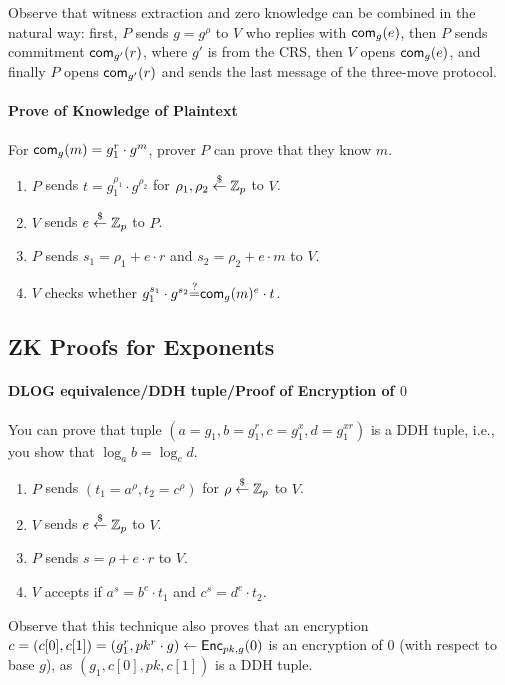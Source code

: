 \documentclass{article}
\begin{document}
Observe that witness extraction and zero knowledge can be combined in
the natural way: first, $P$ sends $g=g^\rho$ to $V$ who replies with
$\mathsf{com}_g(e)$, then $P$ sends commitment $\mathsf{com}_{g'}(r)$, where $g'$ is
from the CRS, then $V$ opens $\mathsf{com}_g(e)$, and finally $P$ opens
$\mathsf{com}_{g'}(r)$ and sends the last message of the three-move protocol.

\paragraph{Prove of Knowledge of Plaintext}
For $\mathsf{com}_{g}(m)=g_1^r\cdot{}g^m$,  prover $P$ can prove that they know
$m$.

\begin{enumerate}
\item $P$ sends $t=g_1^{\rho_1}\cdot{}g^{\rho_2}$ for
  $\rho_1,\rho_2\stackrel{\$}{\leftarrow}\mathbb{Z}_p$ to $V$.
\item $V$ sends $e\stackrel{\$}{\leftarrow}\mathbb{Z}_p$ to $P$.
  \item $P$ sends $s_1=\rho_1+e\cdot{}r$ and $s_2=\rho_2+e\cdot{}m$ to
    $V$.
    \item $V$ checks whether $g_1^{s_1}\cdot{}g^{s_2}{\stackrel{?}{=}}\mathsf{com}_{g}(m)^e\cdot{}t$.
\end{enumerate}


\subsection{ZK Proofs for Exponents}
\paragraph{DLOG equivalence/DDH tuple/Proof of Encryption of $0$}
You can prove that tuple $(a=g_1,b=g_1^r,c=g_1^x,d=g_1^{xr})$ is a DDH
tuple, i.e., you show that $\log_{a}{b}=\log_c{d}$.

\begin{enumerate}
\item $P$ sends $(t_1=a^{\rho},t_2=c^{\rho})$ for $\rho\stackrel{\$}{\leftarrow}\mathbb{Z}_p$ to $V$.
  \item $V$ sends $e\stackrel{\$}{\leftarrow}\mathbb{Z}_p$ to $V$.
  \item $P$ sends $s=\rho+e\cdot{}r$ to $V$.
    \item $V$ accepts if $a^s=b^e\cdot{}t_1$ and $c^s=d^e\cdot{}t_2$.
\end{enumerate}

Observe that this technique also proves that an encryption
$c=(c[0],c[1])=(g_1^r,pk^r\cdot{}g)\leftarrow{\mathsf{Enc}}_{pk,g}(0)$ is an
encryption of $0$ (with respect to base $g$), as $(g_1,c[0],pk,c[1])$
is a DDH tuple.
\end{document}
